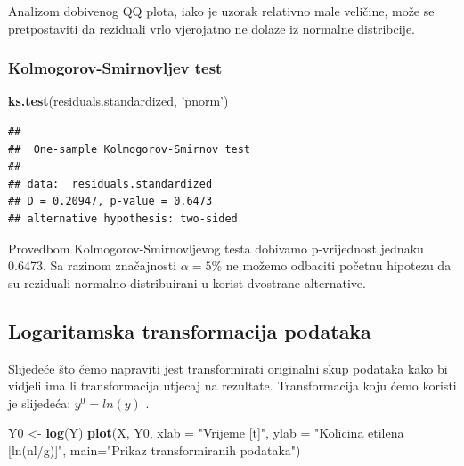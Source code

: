 \documentclass[]{article}
\newenvironment{Shaded}{\begin{snugshade}}{\end{snugshade}}
\newcommand{\KeywordTok}[1]{\textcolor[rgb]{0.13,0.29,0.53}{\textbf{{#1}}}}
\newcommand{\DataTypeTok}[1]{\textcolor[rgb]{0.13,0.29,0.53}{{#1}}}
\newcommand{\StringTok}[1]{\textcolor[rgb]{0.31,0.60,0.02}{{#1}}}
\newcommand{\NormalTok}[1]{{#1}}
\begin{document}
Analizom dobivenog QQ plota, iako je uzorak relativno male veličine,
može se pretpostaviti da reziduali vrlo vjerojatno ne dolaze iz normalne
distribcije.

\subsubsection{Kolmogorov-Smirnovljev
test}\label{kolmogorov-smirnovljev-test}

\begin{Shaded}
\begin{Highlighting}[]
\KeywordTok{ks.test}\NormalTok{(residuals.standardized, }\StringTok{'pnorm'}\NormalTok{)}
\end{Highlighting}
\end{Shaded}

\begin{verbatim}
## 
##  One-sample Kolmogorov-Smirnov test
## 
## data:  residuals.standardized
## D = 0.20947, p-value = 0.6473
## alternative hypothesis: two-sided
\end{verbatim}

Provedbom Kolmogorov-Smirnovljevog testa dobivamo p-vrijednost jednaku
0.6473. Sa razinom značajnosti \(\alpha=5\%\) ne možemo odbaciti početnu
hipotezu da su reziduali normalno distribuirani u korist dvostrane
alternative.

\subsection{Logaritamska transformacija
podataka}\label{logaritamska-transformacija-podataka}

Slijedeće što ćemo napraviti jest transformirati originalni skup
podataka kako bi vidjeli ima li transformacija utjecaj na rezultate.
Transformacija koju ćemo koristi je slijedeća: \(y^0 = ln(y)\) .

\begin{Shaded}
\begin{Highlighting}[]
\NormalTok{Y0 <-}\StringTok{ }\KeywordTok{log}\NormalTok{(Y)}
\KeywordTok{plot}\NormalTok{(X, Y0, }\DataTypeTok{xlab =} \StringTok{"Vrijeme [t]"}\NormalTok{, }\DataTypeTok{ylab =} \StringTok{"Kolicina etilena [ln(nl/g)]"}\NormalTok{, }\DataTypeTok{main=}\StringTok{"Prikaz transformiranih podataka"}\NormalTok{)}
\end{Highlighting}
\end{Shaded}
\end{document}
